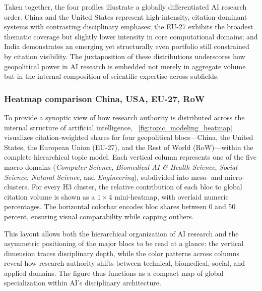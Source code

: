 \documentclass{article}
\begin{document}
Taken together, the four profiles illustrate a globally differentiated AI research order. China and the United States represent high-intensity, citation-dominant systems with contrasting disciplinary emphases; the EU-27 exhibits the broadest thematic coverage but slightly lower intensity in core computational domains; and India demonstrates an emerging yet structurally even portfolio still constrained by citation visibility. The juxtaposition of these distributions underscores how geopolitical power in AI research is embedded not merely in aggregate volume but in the internal composition of scientific expertise across subfields.

\subsubsection{Heatmap comparison China, USA, EU-27, RoW}

To provide a synoptic view of how research authority is distributed across the internal structure of artificial intelligence, \figurename~\ref{fig:topic_modeling_heatmap} visualizes citation-weighted shares for four geopolitical blocs—China, the United States, the European Union (EU-27), and the Rest of World (RoW)—within the complete hierarchical topic model. Each vertical column represents one of the five macro-domains (\emph{Computer Science}, \emph{Biomedical AI \& Health Science}, \emph{Social Science}, \emph{Natural Science}, and \emph{Engineering}), subdivided into meso- and micro-clusters. For every H3 cluster, the relative contribution of each bloc to global citation volume is shown as a $1\times4$ mini-heatmap, with overlaid numeric percentages. The horizontal colorbar encodes bloc shares between 0 and 50 percent, ensuring visual comparability while capping outliers.

This layout allows both the hierarchical organization of AI research and the asymmetric positioning of the major blocs to be read at a glance: the vertical dimension traces disciplinary depth, while the color patterns across columns reveal how research authority shifts between technical, biomedical, social, and applied domains. The figure thus functions as a compact map of global specialization within AI’s disciplinary architecture.
\end{document}
